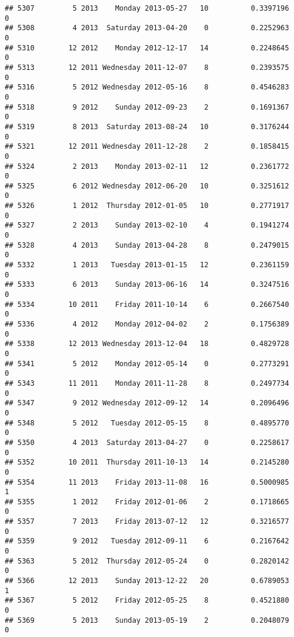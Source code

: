 \documentclass[
]{article}
\begin{document}
\begin{verbatim}
## 5307         5 2013    Monday 2013-05-27   10          0.3397196             0
## 5308         4 2013  Saturday 2013-04-20    0          0.2252963             0
## 5310        12 2012    Monday 2012-12-17   14          0.2248645             0
## 5313        12 2011 Wednesday 2011-12-07    8          0.2393575             0
## 5316         5 2012 Wednesday 2012-05-16    8          0.4546283             0
## 5318         9 2012    Sunday 2012-09-23    2          0.1691367             0
## 5319         8 2013  Saturday 2013-08-24   10          0.3176244             0
## 5321        12 2011 Wednesday 2011-12-28    2          0.1858415             0
## 5324         2 2013    Monday 2013-02-11   12          0.2361772             0
## 5325         6 2012 Wednesday 2012-06-20   10          0.3251612             0
## 5326         1 2012  Thursday 2012-01-05   10          0.2771917             0
## 5327         2 2013    Sunday 2013-02-10    4          0.1941274             0
## 5328         4 2013    Sunday 2013-04-28    8          0.2479015             0
## 5332         1 2013   Tuesday 2013-01-15   12          0.2361159             0
## 5333         6 2013    Sunday 2013-06-16   14          0.3247516             0
## 5334        10 2011    Friday 2011-10-14    6          0.2667540             0
## 5336         4 2012    Monday 2012-04-02    2          0.1756389             0
## 5338        12 2013 Wednesday 2013-12-04   18          0.4829728             0
## 5341         5 2012    Monday 2012-05-14    0          0.2773291             0
## 5343        11 2011    Monday 2011-11-28    8          0.2497734             0
## 5347         9 2012 Wednesday 2012-09-12   14          0.2096496             0
## 5348         5 2012   Tuesday 2012-05-15    8          0.4895770             0
## 5350         4 2013  Saturday 2013-04-27    0          0.2258617             0
## 5352        10 2011  Thursday 2011-10-13   14          0.2145280             0
## 5354        11 2013    Friday 2013-11-08   16          0.5000985             1
## 5355         1 2012    Friday 2012-01-06    2          0.1718665             0
## 5357         7 2013    Friday 2013-07-12   12          0.3216577             0
## 5359         9 2012   Tuesday 2012-09-11    6          0.2167642             0
## 5363         5 2012  Thursday 2012-05-24    0          0.2820142             0
## 5366        12 2013    Sunday 2013-12-22   20          0.6789053             1
## 5367         5 2012    Friday 2012-05-25    8          0.4521880             0
## 5369         5 2013    Sunday 2013-05-19    2          0.2048079             0

\end{verbatim}
\end{document}
